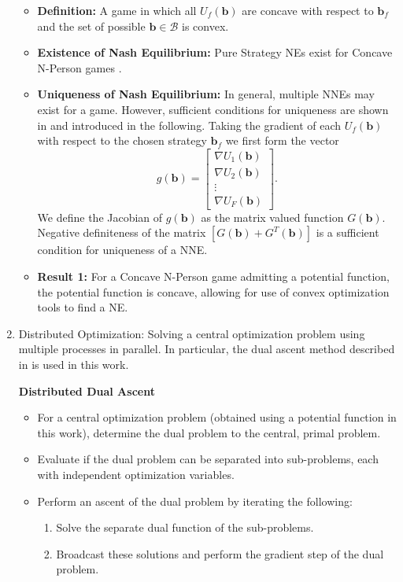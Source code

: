 \begin{enumerate}
\begin{itemize}
\item
\textbf{Definition:} A game in which all $U_f(\mathbf{b})$ are concave with respect to $\mathbf{b}_f$ and the set of possible $\textbf{b}\in\mathcal{B}$ is convex. 
\item 
\textbf{Existence of Nash Equilibrium:} Pure Strategy NEs exist for Concave N-Person games \cite[Thm1]{rosen1964existence}. 
\item
\textbf{Uniqueness of Nash Equilibrium:} In general, multiple NNEs may exist for a game. However, sufficient conditions for uniqueness are shown in \cite[Thm4]{rosen1964existence} and introduced in the following. 
Taking the gradient of each $U_f(\mathbf{b})$ with respect to the chosen strategy $\textbf{b}_f$ we first form the vector
\begin{equation}
g(\mathbf{b})= 
\begin{bmatrix}
\nabla U_{1}(\mathbf{b})
\\
\nabla U_{2}(\mathbf{b})
\\
\vdots\\
\nabla U_{F}(\mathbf{b})
\end{bmatrix}.
\end{equation}
We define the Jacobian of $g(\mathbf{b}) $ as the matrix valued function $G(\mathbf{b}) $.
Negative definiteness of the matrix $[G(\mathbf{b})+G^{T}(\mathbf{b})] $ is a sufficient condition for uniqueness of a NNE.
\item \textbf{Result 1:} For a Concave N-Person game admitting a potential function, the potential function is concave, allowing for use of convex optimization tools to find a NE. 

\end{itemize}




\item Distributed Optimization: Solving a central optimization problem using multiple processes in parallel.
In particular, the dual ascent method described in \cite{boyd2011distributed} is used in this work.

\textbf{Distributed Dual Ascent} 
\begin{itemize}
\item For a central optimization problem (obtained using a potential function in this work), determine the dual problem to the central, primal problem.
\item Evaluate if the dual problem can be separated into sub-problems, each with independent optimization variables.
\item Perform an ascent of the dual problem by iterating the following:
\begin{enumerate}
\item Solve the separate dual function of the sub-problems.
\item Broadcast these solutions and perform the gradient step of the dual problem.
\end{enumerate}
\end{itemize}


\end{enumerate}
